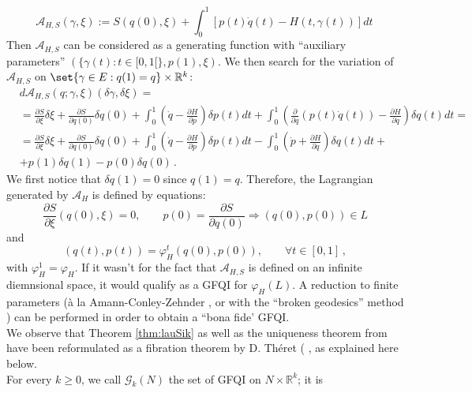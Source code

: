 \documentclass{article}
\newcommand{\1}{\mathbbm{1}}
\theoremstyle{remark}
\begin{document}
{{\begin{equation*}
\mathscr{A}_{H,S}(\gamma, \xi):= S(q(0), \xi) + \int_0^1 \left[p(t)\dot{q}(t) - H(t, \gamma(t))\right]dt\, 
\end{equation*}
Then $\mathscr{A}_{H,S}$ can be considered as a generating function with ``auxiliary parameters'' $(\{\gamma(t): t \in [0,1[\},p(1),\xi)$. We then search for the variation of $\mathscr{A}_{H,S}$ on $\set{\gamma \in E:q(1) = q} \times \mathbb{R}^k$: 
\begin{equation}
\begin{split}
& d \mathscr{A}_{H,S}(q; \gamma, \xi)(\delta \gamma,\delta\xi) = \\
& = \frac{\partial S}{\partial \xi} \delta \xi + \frac{\partial S}{\partial q(0)} \delta q(0) + \int^1_0 \left( \dot{q} - \frac{\partial H}{\partial p}\right)\delta p(t)dt + \int^1_0\left( \frac{\partial}{\partial q}(p(t)\dot{q}(t)) - \frac{\partial H}{\partial q} \right) \delta q(t) dt = \\
& = \frac{\partial S}{\partial \xi} \delta \xi + \frac{\partial S}{\partial q(0)} \delta q(0) + \int^1_0 \left( \dot{q} - \frac{\partial H}{\partial p}\right)\delta p(t)dt - \int^1_0 \left(\dot{p} + \frac{\partial H}{\partial q} \right) \delta q(t) dt + \\
& + p(1) \delta q(1) - p(0) \delta q(0)\, .
\end{split}  
\end{equation}
We first notice that $\delta q(1) = 0$ since $q(1) = q$. Therefore, the Lagrangian generated by $\mathscr{A}_H$ is defined by equations:
$$\frac{\partial S}{\partial \xi}(q(0),\xi) = 0, \qquad p(0) = \frac{\partial S}{\partial q(0)} \Rightarrow (q(0),p(0)) \in L$$
and
$$(q(t),p(t)) = \varphi_H^t(q(0),p(0)), \qquad \forall t \in [0,1]\, ,$$
with $\varphi_H^1 = \varphi_H$. If it wasn't for the fact that $\mathscr{A}_{H,S}$ is defined on an infinite diemnsional space, it would qualify as a GFQI for $\varphi_H(L)$.  A reduction to finite parameters (\`a la Amann-Conley-Zehnder \cite[Section 3]{ACZ}, \cite[(2.1.4)]{Cha1} or with the ``broken geodesics'' method \cite{Cha2}) can be performed in order to obtain a ``bona fide' GFQI. \\ 
\indent We observe that Theorem \ref{thm:lauSik} as well as the uniqueness theorem from \cite{vit92} have been reformulated as a fibration theorem by D. Th\'eret ( \cite[top of Page 256, Theorem 4.2]{the99}, as explained here below. \\
For every $k \ge 0$, we call $\mathscr{G}_k(N)$ the set of GFQI on $N \times \mathbb{R}^k$; it is
}}
\end{document}
